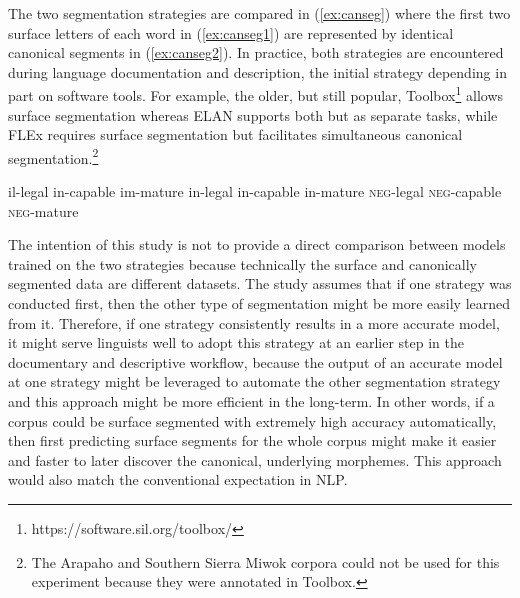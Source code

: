 The two segmentation strategies are compared in (\ref{ex:canseg}) where the first two surface letters of each word in (\ref{ex:canseg1}) are represented by identical canonical segments in (\ref{ex:canseg2}). In practice, both strategies are encountered during language documentation and description, the initial strategy depending in part on software tools. For example, the older, but still popular, Toolbox\footnote{https://software.sil.org/toolbox/} allows surface segmentation whereas ELAN \citep{auer_elan_2010} supports both but as separate tasks, while FLEx \citep{baines_overview_2018} requires surface segmentation but facilitates simultaneous canonical segmentation.\footnote{The Arapaho and Southern Sierra Miwok corpora could not be used for this experiment because they were annotated in Toolbox.}  


\pex   
\label{ex:canseg}
\a il-legal \hspace{6mm} in-capable \hspace{5mm} im-mature
\label{ex:canseg1}
\a in-legal \hspace{5mm} in-capable \hspace{5mm} in-mature
\label{ex:canseg2}
\a \textsc{neg}-legal \hspace{1mm} \textsc{neg}-capable \hspace{1mm} \textsc{neg}-mature
\label{ex:canseg3}
\xe


The intention of this study is not to provide a direct comparison between models trained on the two strategies because technically the surface and canonically segmented data are different datasets. The study assumes that if one strategy was conducted first, then the other type of segmentation might be more easily learned from it. Therefore, if one strategy consistently results in a more accurate model, it might serve linguists well to adopt this strategy at an earlier step in the documentary and descriptive workflow, because the output of an accurate model at one strategy might be leveraged to automate the other segmentation strategy and this approach might be more efficient in the long-term. In other words, if a corpus could be surface segmented with extremely high accuracy automatically, then first predicting surface segments for the whole corpus might make it easier and faster to later discover the canonical, underlying morphemes. This approach would also match the conventional expectation in NLP. 

